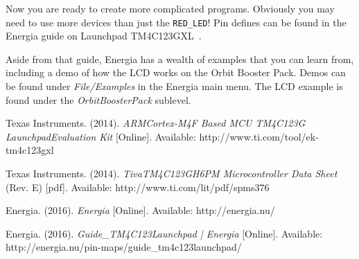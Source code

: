 \documentclass{article}
\begin{document}
Now you are ready to create more complicated programs.  Obviously you may need to use more devices than just the \texttt{RED\_LED}!  Pin defines can be found in the Energia guide on Launchpad TM4C123GXL~\cite{energiaLaunchpadGuide}.

Aside from that guide, Energia has a wealth of examples that you can learn from, including a demo of how the LCD works on the Orbit Booster Pack.  Demos can be found under \emph{File/Examples} in the Energia main menu.  The LCD example is found under the \emph{OrbitBoosterPack} sublevel.


\begin{flushleft}
\begin{thebibliography}{3}

	Texas Instruments.
	(2014).
	\emph{ARM\textregistered Cortex\textregistered-M4F Based MCU TM4C123G Launchpad\texttrademark Evaluation Kit} [Online].
	Available: http://www.ti.com/tool/ek-tm4c123gxl

	Texas Instruments.
	(2014).
	\emph{Tiva\texttrademark TM4C123GH6PM Microcontroller Data Sheet} (Rev. E) [pdf].
	Available: http://www.ti.com/lit/pdf/spms376

	Energia.
	(2016).
	\emph{Energia} [Online].
	Available: http://energia.nu/

	Energia.
	(2016).
	\emph{Guide\_TM4C123Launchpad | Energia} [Online].
	Available: http://energia.nu/pin-maps/guide\_tm4c123launchpad/


\end{thebibliography}
\end{flushleft}
\end{document}
